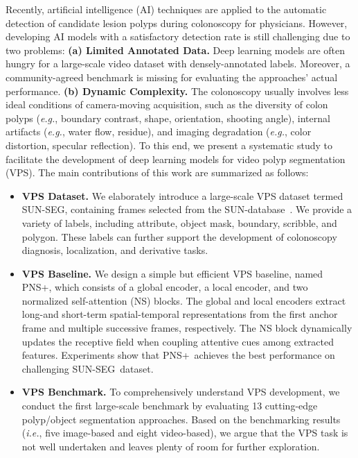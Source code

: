 \documentclass[default,iicol]{sn-jnl}
\theoremstyle{thmstyleone}
\theoremstyle{thmstyletwo}
\theoremstyle{thmstylethree}
\def\ie{\emph{i.e.}}
\def\eg{\emph{e.g.}}
\def\ourmodel{PNS+}
\def\ourdataset{SUN-SEG}
\begin{document}
Recently, artificial intelligence (AI) techniques are applied to the automatic detection of candidate lesion polyps during colonoscopy for physicians.
However, developing AI models with a satisfactory detection rate is still challenging due to two problems: 
\textbf{(a) Limited Annotated Data.} Deep learning models are often hungry for a large-scale video dataset with densely-annotated labels.
Moreover, a community-agreed benchmark is missing for evaluating the approaches' actual performance.
\textbf{(b) Dynamic Complexity.} The colonoscopy usually involves less ideal conditions of camera-moving acquisition, such as the diversity of colon polyps (\eg, boundary contrast, shape, orientation, shooting angle), internal artifacts (\eg, water flow, residue), and imaging degradation (\eg, color distortion, specular reflection).
To this end, we present a systematic study to facilitate the development of deep learning models for video polyp segmentation (VPS).
The main contributions of this work are summarized as follows:
\begin{itemize}
    \item \textbf{VPS Dataset.} We elaborately introduce a large-scale VPS dataset termed \ourdataset, containing  frames selected from the SUN-database~\cite{misawa2020development}.
We provide a variety of labels, including attribute, object mask, boundary, scribble, and polygon.
These labels can further support the development of colonoscopy diagnosis, localization, and derivative tasks.
    
    \item \textbf{VPS Baseline.} We design a simple but efficient VPS baseline, named \ourmodel, which consists of a global encoder, a local encoder, and two normalized self-attention (NS) blocks.
The global and local encoders extract long-and short-term spatial-temporal representations from the first anchor frame and multiple successive frames, respectively.
The NS block dynamically updates the receptive field when coupling attentive cues among extracted features.
Experiments show that \ourmodel~achieves the best performance on challenging \ourdataset~dataset.

    \item \textbf{VPS Benchmark.} To comprehensively understand VPS development, we conduct the first large-scale benchmark by evaluating 13 cutting-edge polyp/object segmentation approaches.
Based on the benchmarking results (\ie, five image-based and eight video-based), we argue that the VPS task is not well undertaken and leaves plenty of room for further exploration.
\end{itemize}
\end{document}
